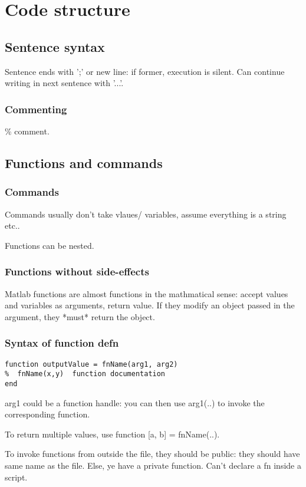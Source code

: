 \documentclass[oneside, article]{memoir}
\begin{document}
\section{Code structure}
\subsection{Sentence syntax}
Sentence ends with ';' or new line: if former, execution is silent. Can continue writing in next sentence with '...'.

\subsubsection{Commenting}
\% comment.

\subsection{Functions and commands}
\subsubsection{Commands}
Commands usually don't take vlaues/ variables, assume everything is a string etc..

Functions can be nested.

\subsubsection{Functions without side-effects}
Matlab functions are almost functions in the mathmatical sense: accept values and variables as arguments, return value. If they modify an object passed in the argument, they *must* return the object.

\subsubsection{Syntax of function defn}
\begin{verbatim}
function outputValue = fnName(arg1, arg2)
%  fnName(x,y)  function documentation
end

\end{verbatim}

arg1 could be a function handle: you can then use arg1(..) to invoke the corresponding function.

To return multiple values, use function [a, b] = fnName(..).

To invoke functions from outside the file, they should be public: they should have same name as the file. Else, ye have a private function. Can't declare a fn inside a script.
\end{document}
